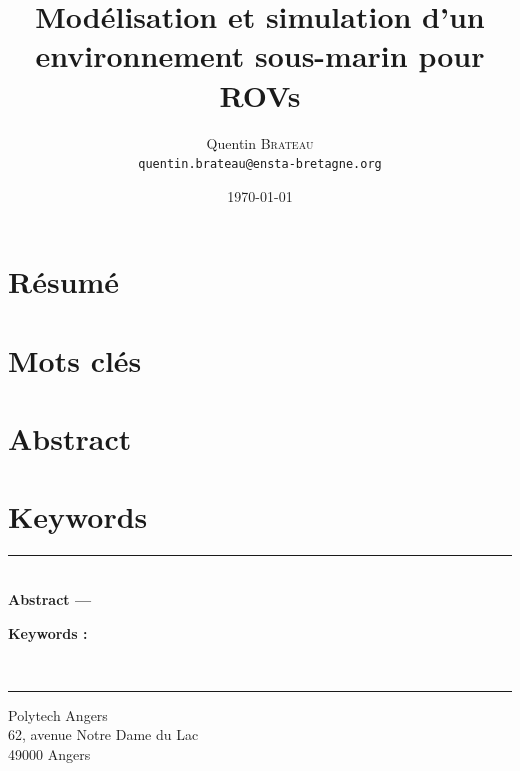 \documentclass{rapport}
\title{Modélisation et simulation d'un environnement sous-marin pour ROVs}
\author{Quentin \textsc{Brateau} \\ \texttt{quentin.brateau@ensta-bretagne.org}}
\date{\today}
\begin{document}
	\frontmatter
	
	\maketitle

	\pagestyle{plain}
	\cleardoublepage

	\section*{Résumé}
	
	\section*{Mots clés}
	

	\section*{Abstract}
	
	\section*{Keywords}
	
	
	\clearpage

	\tableofcontents

	\mainmatter
	\pagestyle{fancy}
	
	
	
	
	
	
	
	\appendix
	\cleardoublepage
	

	\clearpage
	\label{chapter:lof}
	\listoffigures

	\clearpage
	\label{chapter:lot}
	\listoftables

	\label{sec:glossaire}
	\printglossaries

	\clearpage

	
	

	\pagestyle{plain}
	\cleartoleftpage
	
	\vspace*{\fill}
	\noindent\rule[2pt]{\textwidth}{0.5pt}\\
	\textbf{Abstract ---}
	

	{\textbf{Keywords :}}
	
	\\
	\noindent\rule[2pt]{\textwidth}{0.5pt}
	\begin{center}
		Polytech Angers\\
		62, avenue Notre Dame du Lac\\
		49000 Angers
	\end{center}
	\vspace*{\fill}
\end{document}
